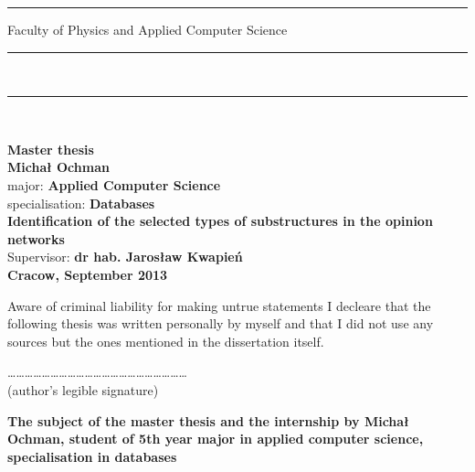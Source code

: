 \rule{26.75mm}{0pt}{
{\large \textsf{Faculty of Physics and Applied Computer Science}}\\
\rule{\textwidth}{3pt}\\
\rule[2ex]
{\textwidth}{1pt}\\
\vspace{7ex}
\begin{center}
{\LARGE \bf \textsf{Master thesis}}\\
\vspace{13ex}
{\bf \Large \textsf{Michał Ochman}}\\
\vspace{3ex}
{\small \sf major: {\bf \textsf{Applied Computer Science}}}\\
\vspace{1.5ex}
{\small \sf specialisation: {\bf \textsf{Databases}}}\\
\vspace{10ex}
{\bf \huge \textsf{Identification of the selected types of substructures in the opinion networks}}\\
\vspace{14ex}
{\Large \sf Supervisor: {\bf \textsf{dr hab. Jarosław Kwapień}}}\\
\vspace{22ex}
{\large \bf \textsf{Cracow, September 2013}}
\end{center}

\newpage
\thispagestyle{empty}
Aware of criminal liability for making untrue statements I decleare that
the following thesis was written personally by myself and that I did not use
any sources but the ones mentioned in the dissertation itself.

\vspace{10ex}
\begin{flushright}
\ldots\ldots\ldots\ldots\ldots\ldots\ldots\ldots\ldots\ldots\ldots\ldots\ldots\ldots\ldots\ldots\ldots\ldots\ldots\ldots\ldots\\
(author's legible signature)
\end{flushright}


\newpage

\begin{center}
{\bf The subject of the master thesis and the internship by Michał Ochman,
student of 5th year major in applied computer science, specialisation in databases}\\
\end{center}

}
